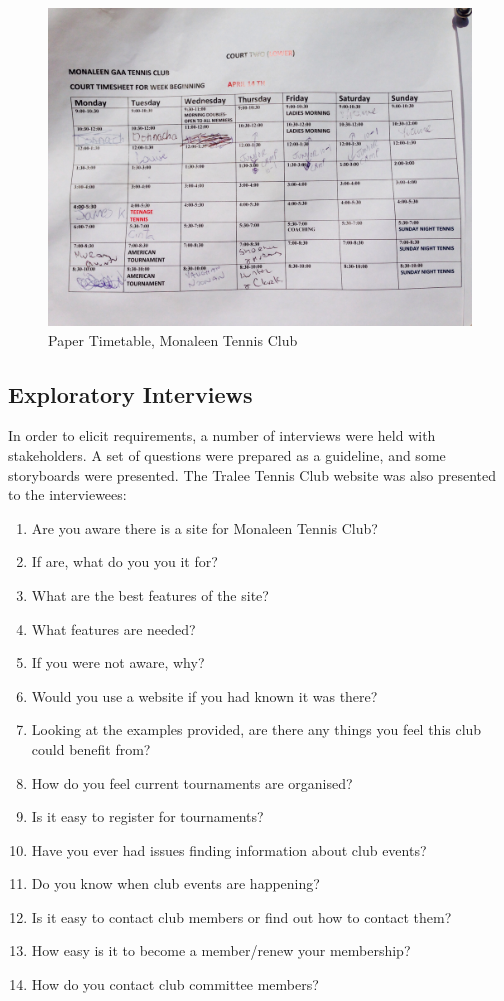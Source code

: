 \begin{figure}[H]
\begin{center}
\includegraphics[width=14cm]{originaltt.jpg}
\end{center}
\caption{Paper Timetable, Monaleen Tennis Club}
\label{fig:papertt}
\end{figure}

\subsection{Exploratory Interviews}

In order to elicit requirements, a number of interviews were held with stakeholders. A set of questions were prepared as a guideline, and some storyboards were presented. The Tralee Tennis Club website was also presented to the interviewees:

\begin{enumerate}
\item Are you aware there is a site for Monaleen Tennis Club?
\item If are, what do you you it for?
\item What are the best features of the site? 
\item What features are needed?
\item If you were not aware, why? 
\item Would you use a website if you had known it was there?
\item Looking at the examples provided, are there any things you feel this club could benefit from?
\item How do you feel current tournaments are organised?
\item Is it easy to register for tournaments?
\item Have you ever had issues finding information about club events?
\item Do you know when club events are happening?
\item Is it easy to contact club members or find out how to contact them?
\item How easy is it to become a member/renew your membership?
\item How do you contact club committee members?  
\end{enumerate}


